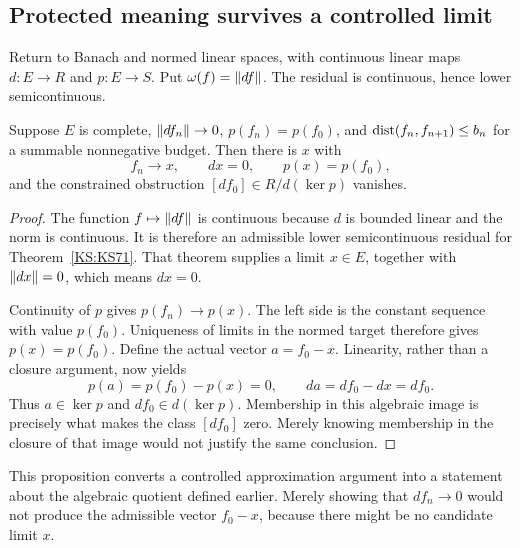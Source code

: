\subsection{Protected meaning survives a controlled limit}
Return to Banach and normed linear spaces, with continuous linear maps \(d:E\to R\) and \(p:E\to S\). Put \(\omega(f)=\left\lVert df\right\rVert\). The residual is continuous, hence lower semicontinuous.

\begin{KSproposition}\label{KS:KS73}
Suppose \(E\) is complete, \(\left\lVert df_n\right\rVert\to0\), \(p(f_n)=p(f_0)\), and \(\operatorname{dist}(f_n,f_{n+1})\le b_n\) for a summable nonnegative budget. Then there is \(x\) with
\[
 f_n\to x,\qquad dx=0,\qquad p(x)=p(f_0),
\]
and the constrained obstruction \([df_0]\in R/d(\ker p)\) vanishes.
\end{KSproposition}
\begin{proof}
The function \(f\mapsto\left\lVert df\right\rVert\) is continuous because \(d\) is bounded linear and the norm is continuous. It is therefore an admissible lower semicontinuous residual for Theorem~\ref{KS:KS71}. That theorem supplies a limit \(x\in E\), together with \(\left\lVert dx\right\rVert=0\), which means \(dx=0\).

Continuity of \(p\) gives \(p(f_n)\to p(x)\). The left side is the constant sequence with value \(p(f_0)\). Uniqueness of limits in the normed target therefore gives \(p(x)=p(f_0)\). Define the actual vector \(a=f_0-x\). Linearity, rather than a closure argument, now yields
\[
 p(a)=p(f_0)-p(x)=0,\qquad da=df_0-dx=df_0.
\]
Thus \(a\in\ker p\) and \(df_0\in d(\ker p)\). Membership in this algebraic image is precisely what makes the class \([df_0]\) zero. Merely knowing membership in the closure of that image would not justify the same conclusion.
\end{proof}
This proposition converts a controlled approximation argument into a statement about the algebraic quotient defined earlier. Merely showing that \(df_n\to0\) would not produce the admissible vector \(f_0-x\), because there might be no candidate limit \(x\).

